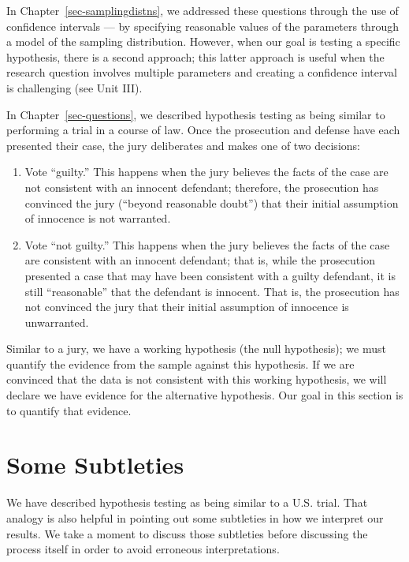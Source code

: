 \documentclass[
  letterpaper,
  DIV=11,
  numbers=noendperiod]{scrreprt}
\providecommand{\tightlist}{%
  \setlength{\itemsep}{0pt}\setlength{\parskip}{0pt}}\usepackage{longtable,booktabs,array}
\theoremstyle{definition}
\theoremstyle{definition}
\theoremstyle{plain}
\theoremstyle{remark}
\begin{document}
In Chapter~\ref{sec-samplingdistns}, we addressed these questions
through the use of confidence intervals --- by specifying reasonable
values of the parameters through a model of the sampling distribution.
However, when our goal is testing a specific hypothesis, there is a
second approach; this latter approach is useful when the research
question involves multiple parameters and creating a confidence interval
is challenging (see Unit III).

In Chapter~\ref{sec-questions}, we described hypothesis testing as being
similar to performing a trial in a course of law. Once the prosecution
and defense have each presented their case, the jury deliberates and
makes one of two decisions:

\begin{enumerate}
\def\labelenumi{\arabic{enumi}.}
\tightlist
\item
  Vote ``guilty.'' This happens when the jury believes the facts of the
  case are not consistent with an innocent defendant; therefore, the
  prosecution has convinced the jury (``beyond reasonable doubt'') that
  their initial assumption of innocence is not warranted.
\item
  Vote ``not guilty.'' This happens when the jury believes the facts of
  the case are consistent with an innocent defendant; that is, while the
  prosecution presented a case that may have been consistent with a
  guilty defendant, it is still ``reasonable'' that the defendant is
  innocent. That is, the prosecution has not convinced the jury that
  their initial assumption of innocence is unwarranted.
\end{enumerate}

Similar to a jury, we have a working hypothesis (the null hypothesis);
we must quantify the evidence from the sample against this hypothesis.
If we are convinced that the data is not consistent with this working
hypothesis, we will declare we have evidence for the alternative
hypothesis. Our goal in this section is to quantify that evidence.

\hypertarget{some-subtleties}{%
\section{Some Subtleties}\label{some-subtleties}}

We have described hypothesis testing as being similar to a U.S. trial.
That analogy is also helpful in pointing out some subtleties in how we
interpret our results. We take a moment to discuss those subtleties
before discussing the process itself in order to avoid erroneous
interpretations.
\end{document}
